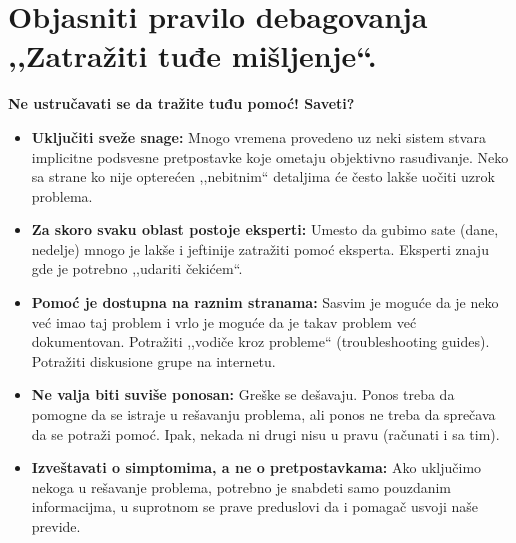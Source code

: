 \documentclass[a4paper]{article}
\begin{document}
\section{Objasniti pravilo debagovanja ,,Zatražiti tuđe mišljenje``.}
  \textbf{Ne ustručavati se da tražite tuđu pomoć! Saveti?}
  \begin{itemize}
    \item \textbf{Uključiti sveže snage:} Mnogo vremena provedeno uz neki sistem stvara implicitne
          podsvesne pretpostavke koje ometaju objektivno rasuđivanje. Neko sa strane ko nije 
          opterećen ,,nebitnim`` detaljima će često lakše uočiti uzrok problema. 
    \item \textbf{Za skoro svaku oblast postoje eksperti:} Umesto da gubimo sate (dane, nedelje)
          mnogo je lakše i jeftinije zatražiti pomoć eksperta. Eksperti znaju gde je potrebno
          ,,udariti čekićem``.
    \item \textbf{Pomoć je dostupna na raznim stranama:} Sasvim je moguće da je neko već imao taj
          problem i vrlo je moguće da je takav problem već dokumentovan. Potražiti 
          ,,vodiče kroz probleme`` (troubleshooting guides). Potražiti diskusione grupe na internetu.
    \item \textbf{Ne valja biti suviše ponosan:} Greške se dešavaju. Ponos treba da pomogne da 
          se istraje u rešavanju problema, ali ponos ne treba da sprečava da se potraži pomoć.
          Ipak, nekada ni drugi nisu u pravu (računati i sa tim).
    \item \textbf{Izveštavati o simptomima, a ne o pretpostavkama:} Ako uključimo nekoga u rešavanje
          problema, potrebno je snabdeti samo pouzdanim informacijma, u suprotnom se prave 
          preduslovi da i pomagač usvoji naše previde. 
  \end{itemize}
\end{document}

